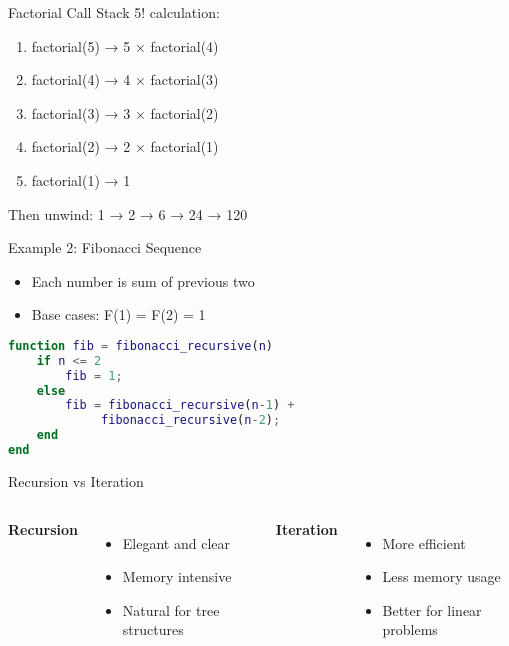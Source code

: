 \documentclass[10pt]{beamer}
\begin{document}
\begin{frame}{Factorial Call Stack}
    5! calculation:
    \begin{enumerate}
        \item factorial(5) → 5 × factorial(4)
        \item factorial(4) → 4 × factorial(3)
        \item factorial(3) → 3 × factorial(2)
        \item factorial(2) → 2 × factorial(1)
        \item factorial(1) → 1
    \end{enumerate}
    Then unwind: 1 → 2 → 6 → 24 → 120
\end{frame}

\begin{frame}[fragile]{Example 2: Fibonacci Sequence}
    \begin{itemize}
        \item Each number is sum of previous two
        \item Base cases: F(1) = F(2) = 1
    \end{itemize}
    \begin{lstlisting}[language=Matlab]
function fib = fibonacci_recursive(n)
    if n <= 2
        fib = 1;
    else
        fib = fibonacci_recursive(n-1) + 
             fibonacci_recursive(n-2);
    end
end
    \end{lstlisting}
\end{frame}

\begin{frame}{Recursion vs Iteration}
    \begin{columns}
        \textbf{Recursion}
        \begin{itemize}
            \item Elegant and clear
            \item Memory intensive
            \item Natural for tree structures
        \end{itemize}
        
        \textbf{Iteration}
        \begin{itemize}
            \item More efficient
            \item Less memory usage
            \item Better for linear problems
        \end{itemize}
    \end{columns}
\end{frame}
\end{document}
